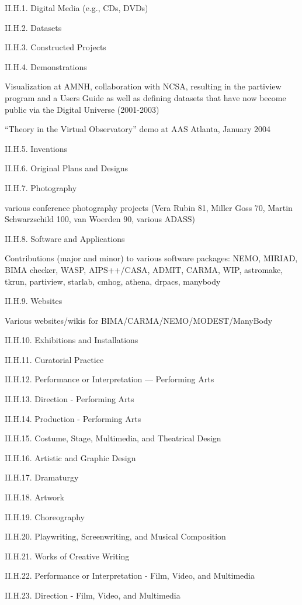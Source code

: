 \documentclass[11pt,letterpaper]{article}
\begin{document}
II.H.1. Digital Media (e.g., CDs, DVDs)

II.H.2. Datasets

II.H.3. Constructed Projects

II.H.4. Demonstrations

Visualization at AMNH, collaboration with NCSA, resulting in the
partiview program and a Users Guide as well as defining datasets that
have now become public via the Digital Universe (2001-2003)

``Theory in the Virtual Observatory'' demo at AAS  Atlanta, January 2004
                
II.H.5. Inventions

II.H.6. Original Plans and Designs

II.H.7. Photography

various conference photography projects (Vera Rubin 81, Miller Goss 70, Martin Schwarzschild 100, van Woerden 90, various ADASS)

II.H.8. Software and Applications

Contributions (major and minor) to various software packages: NEMO,
MIRIAD, BIMA checker, WASP, AIPS++/CASA, ADMIT, CARMA, WIP, astromake,
tkrun, partiview, starlab, cmhog, athena, drpacs, manybody


II.H.9. Websites

Various websites/wikis for BIMA/CARMA/NEMO/MODEST/ManyBody

II.H.10. Exhibitions and Installations

II.H.11. Curatorial Practice

II.H.12. Performance or Interpretation --- Performing Arts

II.H.13. Direction - Performing Arts

II.H.14. Production - Performing Arts

II.H.15. Costume, Stage, Multimedia, and Theatrical Design

II.H.16. Artistic and Graphic Design

II.H.17. Dramaturgy

II.H.18. Artwork

II.H.19. Choreography

II.H.20. Playwriting, Screenwriting, and Musical Composition

II.H.21. Works of Creative Writing

II.H.22. Performance or Interpretation - Film, Video, and Multimedia

II.H.23. Direction - Film, Video, and Multimedia
\end{document}
